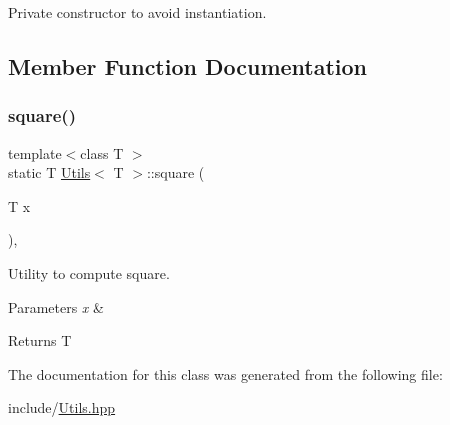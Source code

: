 Private constructor to avoid instantiation. 



\subsection{Member Function Documentation}
\mbox{\label{classUtils_abfc983311119a5d69174d8c082c00411}} 
\subsubsection{\texorpdfstring{square()}{square()}}
{\footnotesize\ttfamily template$<$class T $>$ \\
static T \mbox{\hyperlink{classUtils}{Utils}}$<$ T $>$\+::square (\begin{DoxyParamCaption}\item[{T}]{x }\end{DoxyParamCaption})\hspace{0.3cm}{\ttfamily [inline]}, {\ttfamily [static]}}



Utility to compute square. 


\begin{DoxyParams}{Parameters}
{\em x} & \\
\hline
\end{DoxyParams}
\begin{DoxyReturn}{Returns}
T 
\end{DoxyReturn}


The documentation for this class was generated from the following file\+:\begin{DoxyCompactItemize}
\item 
include/\mbox{\hyperlink{Utils_8hpp}{Utils.\+hpp}}\end{DoxyCompactItemize}
